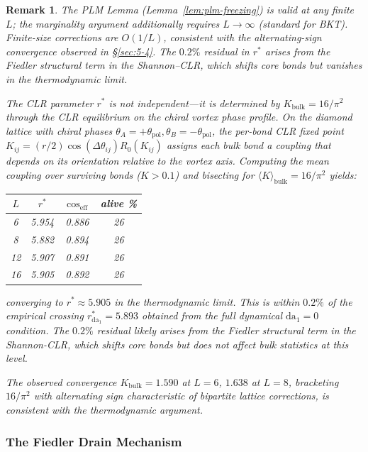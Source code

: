 \documentclass[aps,prd,onecolumn,superscriptaddress,floatfix,12pt]{revtex4-2}
\newcommand{\Rzero}{R_0}
\newcommand{\Kbulk}{K_{\text{bulk}}}
\newtheorem{remark}{Remark}[section]
\begin{document}
\begin{remark}
The PLM Lemma (Lemma~\ref{lem:plm-freezing}) is valid at any finite $L$; the marginality argument additionally requires $L \to \infty$ (standard for BKT). Finite-size corrections are $O(1/L)$, consistent with the alternating-sign convergence observed in \S\ref{sec:5-4}. The $0.2\%$ residual in $r^*$ arises from the Fiedler structural term in the Shannon--CLR, which shifts core bonds but vanishes in the thermodynamic limit.

The CLR parameter $r^*$ is not independent---it is determined by $\Kbulk = 16/\pi^2$ through the CLR equilibrium on the chiral vortex phase profile. On the diamond lattice with chiral phases $\theta_A = +\theta_{\text{pol}}, \theta_B = -\theta_{\text{pol}}$, the per-bond CLR fixed point $K_{ij} = (r/2)\cos(\Delta\theta_{ij})\Rzero(K_{ij})$ assigns each bulk bond a coupling that depends on its orientation relative to the vortex axis. Computing the mean coupling over surviving bonds ($K > 0.1$) and bisecting for $\langle K \rangle_{\text{bulk}} = 16/\pi^2$ yields:
\begin{center}
\begin{tabular}{cccc}
$L$ & $r^*$ & $\cos_{\text{eff}}$ & alive \% \\ \hline
6 & 5.954 & 0.886 & 26 \\
8 & 5.882 & 0.894 & 26 \\
12 & 5.907 & 0.891 & 26 \\
16 & 5.905 & 0.892 & 26
\end{tabular}
\end{center}
converging to $r^* \approx 5.905$ in the thermodynamic limit. This is within $0.2\%$ of the empirical crossing $r^*_{\text{da}_1} = 5.893$ obtained from the full dynamical $\text{da}_1 = 0$ condition. The $0.2\%$ residual likely arises from the Fiedler structural term in the Shannon-CLR, which shifts core bonds but does not affect bulk statistics at this level.

The observed convergence $\Kbulk = 1.590$ at $L{=}6$, $1.638$ at $L{=}8$, bracketing $16/\pi^2$ with alternating sign characteristic of bipartite lattice corrections, is consistent with the thermodynamic argument.
\end{remark}

\subsubsection{The Fiedler Drain Mechanism}\label{sec:fiedler-drain}
\end{document}
